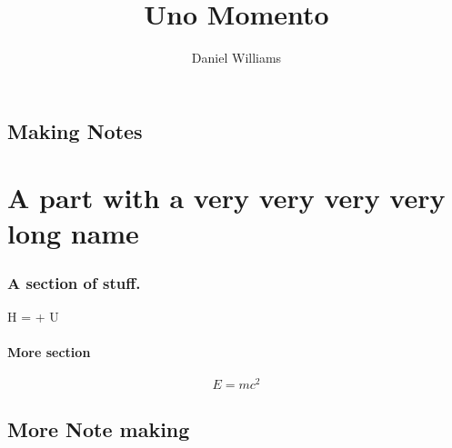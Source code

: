 \documentclass[ebook, openany, oldfontcommands,twocolumn, 10pt]{momento}
\title{Uno Momento}
\author{Daniel Williams}
\begin{document}
\maketitle

\tableofcontents

\lipsum

\chapter{Making Notes}
\label{cha:making-notes}

\lipsum \lipsum

\part{A part with a very very very very long name}
\label{part:part}

\lipsum
\lipsum

\section{A section of stuff.}
\label{sec:section-stuff}

\begin{fequation}
   H =  + U 
\end{fequation}

\lipsum

\subsection{More section}
\label{sec:more-section}

\lipsum[3]
\[
E = mc^2
\]
\lipsum[2]

\chapter{More Note making}
\label{cha:more-note-making}

\lipsum \lipsum \lipsum


\begin{example}
  \lipsum
\end{example}
\end{document}
